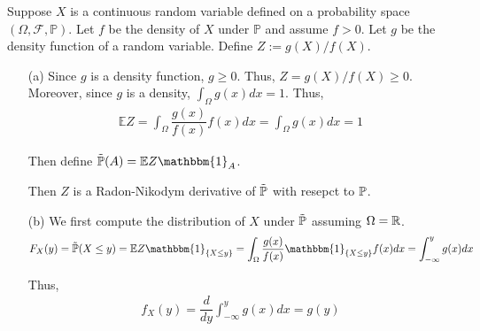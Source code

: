 \documentclass[10pt]{article}
\begin{document}
\begin{solution}[Solution]
Suppose \( X \) is a continuous random variable defined on a probability space \( (\Omega,\mathcal{F},\mathbb{P}) \). Let \( f \) be the density of \( X \) under \( \mathbb{P} \) and assume \( f>0 \). Let \( g \) be the density function of a random variable. Define \( Z:=g(X)/f(X) \).
\begin{enumerate}
    \item[(a)] Since \( g \) is a density function, \( g\geq0 \). Thus, \( Z=g(X)/f(X) \geq 0 \). Moreover, since \( g \) is a density, \( \int_\Omega g(x)dx = 1 \). Thus,
        \begin{align*}
            \mathbb{E}Z = \int_\Omega \dfrac{g(x)}{f(x)}f(x)dx = \int_\Omega g(x)dx = 1
        \end{align*}

        Then define \( \tilde{\PP}(A) = \mathbb{E}Z\mathbbm{1}_A \).

        Then \( Z \) is a Radon-Nikodym derivative of \( \tilde{\mathbb{P}} \) with resepct to \( \mathbb{P} \).

    \item[(b)] We first compute the distribution of \( X \) under \( \tilde{\mathbb{P}} \) assuming \( \Omega=\mathbb{R} \).
        \begin{align*}
            F_X(y) = \tilde{\PP}(X\leq y) = \mathbb{E}Z\mathbbm{1}_{\{X\leq y\}} = \int_\Omega \dfrac{g(x)}{f(x)}\mathbbm{1}_{\{X\leq y\}}f(x)dx = \int_{-\infty}^{y} g(x)dx  
        \end{align*}

        Thus,
        \begin{align*}
            f_X(y) = \dfrac{d}{dy}\int_{-\infty}^{y}g(x)dx = g(y)
        \end{align*}


\end{enumerate}
\end{solution}
\end{document}
